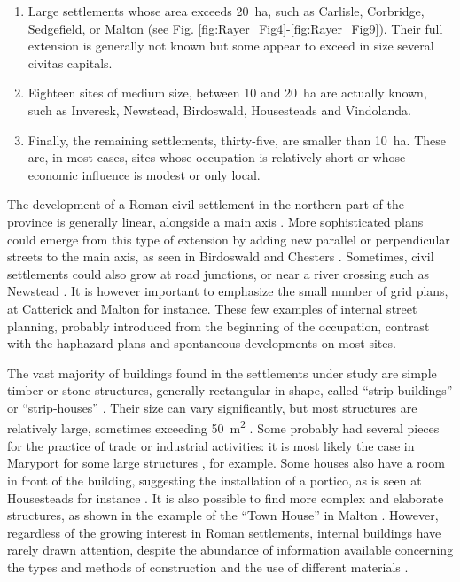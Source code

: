 \begin{enumerate}
	\item Large settlements whose area exceeds \SI{20}{\hectare}, such as Carlisle, Corbridge, Sedgefield, or Malton (see Fig. \ref{fig:Rayer_Fig4}-\ref{fig:Rayer_Fig9}). Their full extension is generally not known but some appear to exceed in size several civitas capitals.
	\item Eighteen sites of medium size, between 10 and \SI{20}{\hectare} are actually known, such as Inveresk, Newstead, Birdoswald, Housesteads and Vindolanda.
	\item Finally, the remaining settlements, thirty-five, are smaller than \SI{10}{\hectare}. These are, in most cases, sites whose occupation is relatively short or whose economic influence is modest or only local. 
\end{enumerate}

The development of a Roman civil settlement in the northern part of the province is generally linear, alongside a main axis \parencites[234--235]{Burnham_1994}[97]{Sommer_2006}. More sophisticated plans could emerge from this type of extension by adding new parallel or perpendicular streets to the main axis, as seen in Birdoswald \parencite[100]{Biggins_1999} and Chesters \parencite[52]{Joseph_1951}. Sometimes, civil settlements could also grow at road junctions, or near a river crossing such as Newstead \parencite{Hunter_2012}. It is however important to emphasize the small number of grid plans, at Catterick \parencites{Wilson_2002a}{Wilson_2002b} and Malton \parencite{Wenham_1974} for instance. These few examples of internal street planning, probably introduced from the beginning of the occupation, contrast with the haphazard plans and spontaneous developments on most sites.

The vast majority of buildings found in the settlements under study are simple timber or stone structures, generally rectangular in shape, 
called “strip-buildings” or “strip-houses” \parencite[232]{Burnham_1994}. 
Their size can vary significantly, but most structures are relatively large, sometimes exceeding \SI{50}{\metre\squared} \parencite[66]{Osborn_2006}. 
Some probably had several pieces for the practice of trade or industrial activities: it is most likely the case in Maryport for some large structures \parencite[128]{Biggins_2004a}, for example. Some houses also have a room in front of the building, suggesting the installation of a portico, as is seen at Housesteads for instance \parencite[67]{Osborn_2006}. It is also possible to find more complex and elaborate structures, as shown in the example of the “Town House” in Malton \parencite[37]{Wenham_1974}. 
However, regardless of the growing interest in Roman settlements, internal buildings have rarely drawn attention, despite the abundance of information available concerning the types and methods of construction and the use of different materials \parencite[35]{Burnham_1988b}. 

